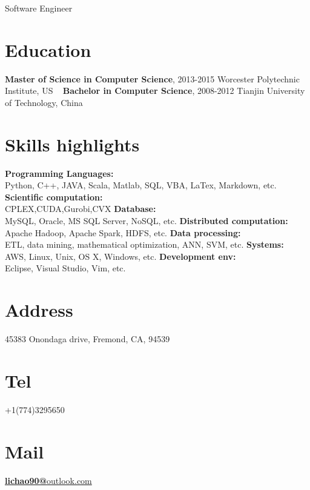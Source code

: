 \documentclass[]{friggeri-cv}
\begin{document}
{Software Engineer}


\begin{aside}
	\section{Education}
	\textbf{Master of Science in 
	Computer Science}, 
	2013-2015
	Worcester Polytechnic 
	Institute, US
	~
	\textbf{Bachelor in 
	Computer Science}, 
	2008-2012
	Tianjin University of 
	Technology, China
	\section{Skills highlights}
	\textbf{Programming Languages:}\\
	Python, C++, JAVA, Scala, Matlab, SQL, VBA, LaTex, Markdown, etc.
	\vspace{3mm}
	\textbf{Scientific computation:}\\
	CPLEX,CUDA,Gurobi,CVX
	\vspace{3mm}
	\textbf{Database:}\\
	MySQL, Oracle, MS SQL Server, NoSQL, etc.
	\vspace{3mm}
	\textbf{Distributed computation:}\\
	Apache Hadoop, Apache Spark, HDFS, etc.
	\vspace{3mm}
	\textbf{Data processing:}\\
	ETL, data mining, mathematical optimization, ANN, SVM, etc.
	\vspace{3mm}
	\textbf{Systems:}\\
	AWS, Linux, Unix, OS X, Windows, etc.
	\vspace{3mm}
	\textbf{Development env:}\\
	Eclipse, Visual Studio, Vim, etc.
	\section{Address}
	45383 Onondaga drive,
	Fremond, CA, 94539
	\section{Tel}
	+1(774)3295650
	\section{Mail}
	\href{mailto:lichao90@outlook.com}{\textbf{lichao90@}outlook.com}

\end{aside}
\end{document}
